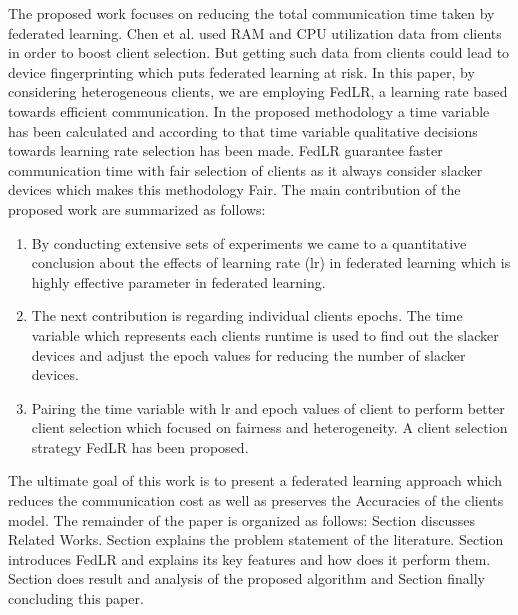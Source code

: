 \documentclass[conference]{IEEEtran}
\newcommand{\RNum}[1]{\uppercase\expandafter{\romannumeral #1\relax}}
\begin{document}
 The proposed work focuses on reducing the total communication time taken by federated learning. Chen et al. \cite{chen2023boosting} used RAM and CPU utilization data from clients in order to boost client selection. But getting such data from clients could lead to device fingerprinting \cite{radhakrishnan2014gtid} \cite{patwari2022dnn} which puts federated learning at risk.  In this paper, by considering heterogeneous clients, we are employing FedLR, a learning rate based towards efficient communication. In the proposed methodology a time variable has been calculated and according to that time variable qualitative decisions towards learning rate selection has been made.
FedLR guarantee faster communication time with fair selection of clients as it always consider slacker devices which makes this methodology Fair. The main contribution of the proposed work are summarized as follows:
\begin{enumerate}
	\item By conducting extensive sets of experiments we came to a quantitative conclusion about the effects of learning rate (lr) in federated learning which is highly effective parameter in federated learning.
	\item The next contribution is regarding individual clients epochs. The time variable which represents each clients runtime is used to find out the slacker devices and adjust the epoch values for reducing the number of slacker devices.
	\item Pairing the time variable with lr and epoch values of client to perform better client selection which focused on fairness and heterogeneity. A client selection strategy FedLR has been proposed.
\end{enumerate}

The ultimate goal of this work is to present a federated learning approach which reduces the communication cost as well as preserves the Accuracies of the clients model. The remainder of the paper is organized as follows: Section \RNum{2} discusses Related Works. Section \RNum{3} explains the problem statement of the literature. Section \RNum{4} introduces FedLR and explains its key features and how does it perform them. Section \RNum{5} does result and analysis of the proposed algorithm and Section \RNum{6} finally concluding this paper.
\end{document}
